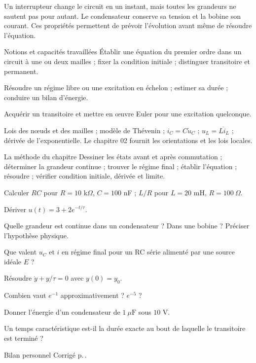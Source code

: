 Un interrupteur change le circuit en un instant, mais toutes les grandeurs ne sautent pas pour autant. Le condensateur conserve sa tension et la bobine son courant. Ces propriétés permettent de prévoir l’évolution avant même de résoudre l’équation.
\begin{loi}{Notions et capacités travaillées}
Établir une équation du premier ordre dans un circuit à une ou deux mailles ; fixer la condition initiale ; distinguer transitoire et permanent.\par Résoudre un régime libre ou une excitation en échelon ; estimer sa durée ; conduire un bilan d’énergie.\par Acquérir un transitoire et mettre en œuvre Euler pour une excitation quelconque.
\end{loi}

Lois des nœuds et des mailles ; modèle de Thévenin ; $i_C=C\dot u_C$ ; $u_L=L\dot i_L$ ; dérivée de l’exponentielle. Le chapitre 02 fournit les orientations et les lois locales.

\begin{methode}{La méthode du chapitre}
Dessiner les états avant et après commutation ; déterminer la grandeur continue ; trouver le régime final ; établir l’équation ; résoudre ; vérifier condition initiale, dérivée et limite.
\end{methode}


\begin{questions}
\item Calculer $RC$ pour $R=10$ k$\Omega$, $C=100$ nF ; $L/R$ pour $L=20$ mH, $R=100\ \Omega$.
\item Dériver $u(t)=3+2e^{-t/\tau}$.
\item Quelle grandeur est continue dans un condensateur ? Dans une bobine ? Préciser l’hypothèse physique.
\item Que valent $u_C$ et $i$ en régime final pour un RC série alimenté par une source idéale $E$ ?
\item Résoudre $\dot y+y/\tau=0$ avec $y(0)=y_0$.
\item Combien vaut $e^{-1}$ approximativement ? $e^{-5}$ ?
\item Donner l’énergie d’un condensateur de $1\ \mu\mathrm{ F}$ sous $10$ V.
\item Un temps caractéristique est-il la durée exacte au bout de laquelle le transitoire est terminé ?
\end{questions}
\begin{docu}{Bilan personnel}
Corrigé p.\,\pageref{ch03-corr-diag}.
\end{docu}


